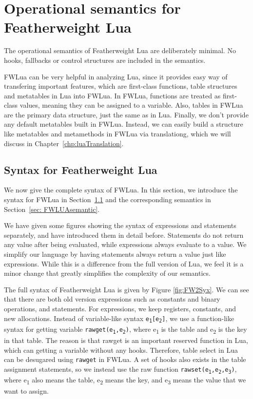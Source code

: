 \chapter{Operational semantics for Featherweight Lua} \label{chp: syntax and semantic}
The operational semantics of Featherweight Lua are deliberately minimal. No hooks, fallbacks or control structures are included in the semantics. 

FWLua can be very helpful in analyzing Lua, since it provides easy way of transfering important features, which are first-class functions, table structures and metatables in Lua into FWLua.
In FWLua, functions are treated as first-class values, meaning they can be assigned to a variable. Also, tables in FWLua are the primary data structure, just the same as in Lua. Finally, we don't provide any default metatables built in FWLua. Instead, we can easily build a structure like metatables and metamethods in FWLua via translationg, which we will discuss in Chapter~\ref{chp:luaTranslation}.

\section{Syntax for Featherweight Lua}\label{sec: FWLUAsyntax}
We now give the complete syntax of FWLua. In this section, we introduce the syntax for FWLua in Section~\ref{sec: FWLUAsyntax} and the corresponding semantics in Section~\ref{sec: FWLUAsemantic}.

We have given some figures showing the syntax of expressions and statements separately, and have introduced them in detail before.
Statements do not return any value after being evaluated, while expressions always evaluate to a value.
We simplify our language by
having statements always return a value just like expressions.
While this is a difference from the full version of Lua,
we feel it is a minor change that greatly simplifies the complexity
of our semantics.

The full syntax of Featherweight Lua is given by Figure \ref{fig:FW2Syx}. We can see that there are both old version expressions such as constants and binary operations, and statements. For expressions, we keep registers, constants, and new allocations.
Instead of variable-like syntax {\tt e\textsubscript{1}[e\textsubscript{2}]}, we use a function-like syntax for getting variable {\tt rawget(e\textsubscript{1},e\textsubscript{2})}, where e\textsubscript{1} is the table and e\textsubscript{2} is the key in that table. The reason is that rawget is an important reserved function in Lua, which can getting a variable without any hooks. Therefore, table select in Lua can be desugared using {\tt rawget} in FWLua.
A set of hooks also exists in the table assignment statements, so we instead use the raw function {\tt rawset(e\textsubscript{1},e\textsubscript{2},e\textsubscript{3})}, where e\textsubscript{1} also means the table, e\textsubscript{2} means the key, and e\textsubscript{3} means the value that we want to assign.

